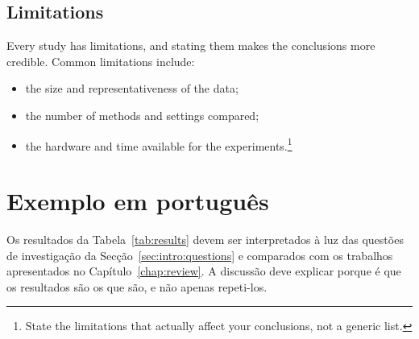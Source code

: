 \subsection{Limitations}
\label{sec:discussion:limitations}

Every study has limitations, and stating them makes the conclusions more
credible. Common limitations include:

\begin{itemize}
  \item the size and representativeness of the data;
  \item the number of methods and settings compared;
  \item the hardware and time available for the experiments.\footnote{State
    the limitations that actually affect your conclusions, not a generic
    list.}
\end{itemize}

\section{Exemplo em português}
\label{sec:discussion:pt}

\begin{otherlanguage}{portuguese}

Os resultados da Tabela~\ref{tab:results} devem ser interpretados à luz das
questões de investigação da Secção~\ref{sec:intro:questions} e comparados
com os trabalhos apresentados no Capítulo~\ref{chap:review}. A discussão
deve explicar porque é que os resultados são os que são, e não apenas
repeti-los.

\end{otherlanguage}
